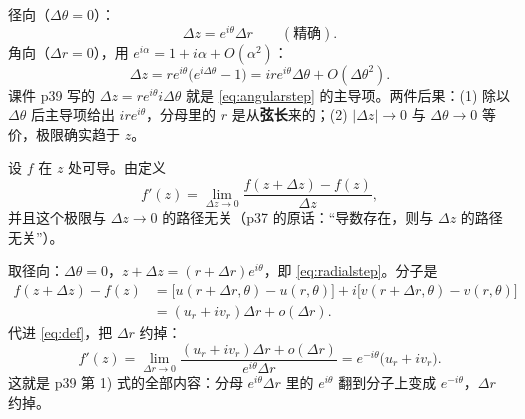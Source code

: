 \documentclass[11pt]{ctexart}
\let\origsubhdr\subhdr
\renewcommand{\subhdr}[1]{\par\needspace{4\baselineskip}\origsubhdr{#1}}
\begin{document}


径向（$\Delta\theta=0$）：
\begin{equation}\label{eq:radialstep}
\Delta z=e^{i\theta}\Delta r \qquad(\text{精确}).
\end{equation}
角向（$\Delta r=0$），用 $e^{i\alpha}=1+i\alpha+O(\alpha^2)$：
\begin{equation}\label{eq:angularstep}
\Delta z=re^{i\theta}\bigl(e^{i\Delta\theta}-1\bigr)=ire^{i\theta}\Delta\theta+O(\Delta\theta^2).
\end{equation}
课件 p39 写的 $\Delta z=re^{i\theta}i\Delta\theta$ 就是 \eqref{eq:angularstep} 的主导项。两件后果：(1) 除以 $\Delta\theta$ 后主导项给出 $ire^{i\theta}$，分母里的 $r$ 是从\textbf{弦长}来的；(2) $|\Delta z|\to0$ 与 $\Delta\theta\to0$ 等价，极限确实趋于 $z$。



设 $f$ 在 $z$ 处可导。由定义
\begin{equation}\label{eq:def}
f'(z)=\lim_{\Delta z\to0}\frac{f(z+\Delta z)-f(z)}{\Delta z},
\end{equation}
并且这个极限与 $\Delta z\to0$ 的路径无关（p37 的原话：“导数存在，则与 $\Delta z$ 的路径无关”）。

取径向：$\Delta\theta=0$，$z+\Delta z=(r+\Delta r)e^{i\theta}$，即 \eqref{eq:radialstep}。分子是
\begin{align*}
f(z+\Delta z)-f(z)&=\bigl[u(r+\Delta r,\theta)-u(r,\theta)\bigr]
+i\bigl[v(r+\Delta r,\theta)-v(r,\theta)\bigr]\\
&=(u_r+iv_r)\Delta r+o(\Delta r).
\end{align*}
代进 \eqref{eq:def}，把 $\Delta r$ 约掉：
\begin{equation}\label{eq:radial}
f'(z)=\lim_{\Delta r\to0}\frac{(u_r+iv_r)\Delta r+o(\Delta r)}{e^{i\theta}\Delta r}
=e^{-i\theta}\bigl(u_r+iv_r\bigr).
\end{equation}
这就是 p39 第 1) 式的全部内容：分母 $e^{i\theta}\Delta r$ 里的 $e^{i\theta}$ 翻到分子上变成 $e^{-i\theta}$，$\Delta r$ 约掉。
\end{document}
